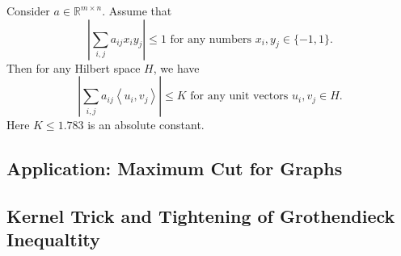 \begin{theorem}
\label{thm:3.5.1}
Consider $a \in \mathbb{R}^{m \times n}$. Assume that 
\[ \left| \sum_{i, j}^{} a_{ij} x_i y_j \right| \leq 1 \text{ for any numbers } x_i, y_j \in \{-1, 1\}. \]
Then for any Hilbert space $H$, we have 
\[ \left| \sum_{i, j}^{} a_{ij} \left\langle u_i, v_j \right\rangle \right| \leq K \text{ for any unit 
vectors } u_i, v_j \in H. \]
Here $K \leq 1.783$ is an absolute constant.
\end{theorem}


\subsection{Application: Maximum Cut for Graphs}



\subsection{Kernel Trick and Tightening of Grothendieck Inequaltity}


